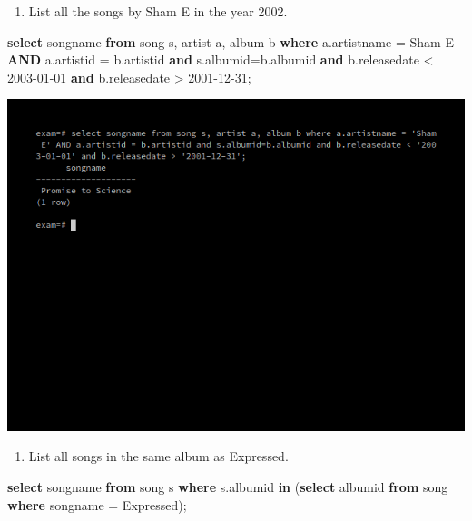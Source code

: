 \documentclass[
]{article}
\newenvironment{Shaded}{}{}
\newcommand{\KeywordTok}[1]{\textcolor[rgb]{0.00,0.44,0.13}{\textbf{#1}}}
\newcommand{\NormalTok}[1]{#1}
\newcommand{\OperatorTok}[1]{\textcolor[rgb]{0.40,0.40,0.40}{#1}}
\newcommand{\StringTok}[1]{\textcolor[rgb]{0.25,0.44,0.63}{#1}}
\providecommand{\tightlist}{%
  \setlength{\itemsep}{0pt}\setlength{\parskip}{0pt}}
\begin{document}
\begin{enumerate}
\def\labelenumi{\arabic{enumi}.}
\setcounter{enumi}{1}
\tightlist
\item
  List all the songs by Sham E in the year 2002.
\end{enumerate}

\begin{Shaded}
\begin{Highlighting}[]
\KeywordTok{select}\NormalTok{ songname }\KeywordTok{from}\NormalTok{ song s, artist a, album b }
   \KeywordTok{where}\NormalTok{ a.artistname }\OperatorTok{=} \StringTok{\textquotesingle{}Sham E\textquotesingle{}} \KeywordTok{AND}\NormalTok{ a.artistid }\OperatorTok{=}\NormalTok{ b.artistid }
      \KeywordTok{and}\NormalTok{ s.albumid}\OperatorTok{=}\NormalTok{b.albumid }\KeywordTok{and}\NormalTok{ b.releasedate }\OperatorTok{<} \StringTok{\textquotesingle{}2003{-}01{-}01\textquotesingle{}} 
      \KeywordTok{and}\NormalTok{ b.releasedate }\OperatorTok{>} \StringTok{\textquotesingle{}2001{-}12{-}31\textquotesingle{}}\NormalTok{;}
\end{Highlighting}
\end{Shaded}

\includegraphics{../Images/Exam_Report/1.png}

\begin{enumerate}
\def\labelenumi{\arabic{enumi}.}
\setcounter{enumi}{2}
\tightlist
\item
  List all songs in the same album as Expressed.
\end{enumerate}

\begin{Shaded}
\begin{Highlighting}[]
\KeywordTok{select}\NormalTok{ songname }\KeywordTok{from}\NormalTok{ song s }\KeywordTok{where} 
\NormalTok{   s.albumid }\KeywordTok{in} 
\NormalTok{   (}\KeywordTok{select}\NormalTok{ albumid }\KeywordTok{from}\NormalTok{ song }\KeywordTok{where}\NormalTok{ songname }\OperatorTok{=} \StringTok{\textquotesingle{}Expressed\textquotesingle{}}\NormalTok{);}
\end{Highlighting}
\end{Shaded}
\end{document}
